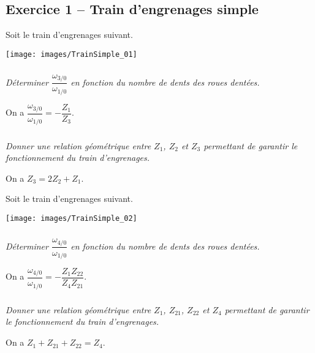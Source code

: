 \documentclass[10pt,fleqn]{article} %
\begin{document}
\def\pathfig{images}

\vspace{4.5cm}
\pagestyle{fancy}
\thispagestyle{plain}

\def\columnseprulecolor{\color{ocre}}
\setlength{\columnseprule}{0.4pt} 

\def\pathfig{images}

\ifprof
\begin{multicols}{2}
\else
\begin{multicols}{2}
\fi


\section*{Exercice 1 -- Train d'engrenages simple}
\setcounter{exo}{0}

\ifprof
\else
Soit le train d'engrenages suivant. 
\begin{center}
\texttt{[image: images/TrainSimple\_01]}
\end{center}
\fi

\subparagraph{}
\textit{Déterminer $\dfrac{\omega_{3/0}}{\omega_{1/0}}$ en fonction du nombre de dents des roues dentées.}
\ifprof
\begin{corrige}
On a $\dfrac{\omega_{3/0}}{\omega_{1/0}}=-\dfrac{Z_1}{Z_3}$.
\end{corrige}
\else
\fi

\subparagraph{}
\textit{Donner une relation géométrique entre $Z_1$, $Z_2$ et $Z_3$ permettant de garantir le fonctionnement du train d'engrenages. }
\ifprof
\begin{corrige}
On a $Z_3 = 2Z_2 + Z_1$.
\end{corrige}
\else
\fi



\ifprof
\else
Soit le train d'engrenages suivant. 
\begin{center}
\texttt{[image: images/TrainSimple\_02]}
\end{center}
\fi

\subparagraph{}
\textit{Déterminer $\dfrac{\omega_{4/0}}{\omega_{1/0}}$ en fonction du nombre de dents des roues dentées.}
\ifprof
\begin{corrige}
On a $\dfrac{\omega_{4/0}}{\omega_{1/0}}=-\dfrac{Z_1Z_{22}}{Z_4Z_{21}}$.
\end{corrige}
\else
\fi

\subparagraph{}
\textit{Donner une relation géométrique entre $Z_1$, $Z_{21}$, $Z_{22}$ et $Z_4$ permettant de garantir le fonctionnement du train d'engrenages. }
\ifprof
\begin{corrige}
On a $Z_1+Z_{21}+Z_{22}= Z_4$.
\end{corrige}
\else
\fi




\end{multicols}
\end{multicols}
\end{document}
